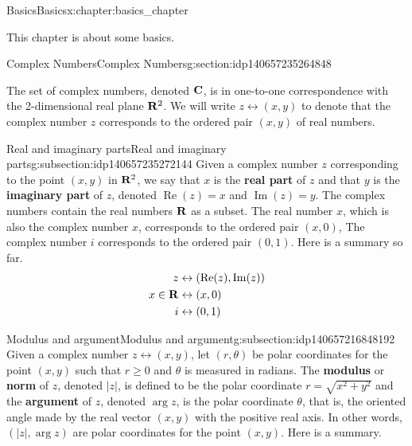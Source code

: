 \documentclass[oneside,10pt,]{book}
\newcommand{\terminology}[1]{\textbf{#1}}
\numberwithin{equation}{section}
\DeclareMathOperator{\re}{Re}
\DeclareMathOperator{\im}{Im}
\newcommand{\C}{{\rm \bf C}}
\newcommand{\R}{{\rm \bf R}}
\newcommand{\amp}{&}
\begin{document}
\begin{chapterptx}{Basics}{}{Basics}{}{}{x:chapter:basics_chapter}
\begin{introduction}{}%
This chapter is about some basics.\end{introduction}%
%
%
\typeout{************************************************}
\typeout{************************************************}
%
\begin{sectionptx}{Complex Numbers}{}{Complex Numbers}{}{}{g:section:idp140657235264848}
\begin{introduction}{}%
The set of complex numbers, denoted \(\C\), is in one-to-one correspondence with the 2-dimensional real plane \(\R^2\). We will write \(z\leftrightarrow (x,y)\) to denote that the complex number \(z\) corresponds to the ordered pair \((x,y)\) of real numbers.%
\end{introduction}%
%
%
\typeout{************************************************}
\typeout{************************************************}
%
\begin{subsectionptx}{Real and imaginary parts}{}{Real and imaginary parts}{}{}{g:subsection:idp140657235272144}
Given a complex number \(z\) corresponding to the point \((x,y)\) in \(\R^2\), we say that \(x\) is the \terminology{real part} of \(z\) and that \(y\) is the \terminology{imaginary part} of \(z\), denoted \(\re(z)=x\) and \(\im(z)=y\). The complex numbers contain the real numbers \(\R\) as a subset. The real number \(x\), which is also the complex number \(x\), corresponds to the ordered pair \((x,0)\), The complex number \(i\) corresponds to the ordered pair \((0,1)\). Here is a summary so far.%
%
\begin{align*}
z \amp \leftrightarrow (\re(z),\im(z))\\
x\in \R \amp \leftrightarrow (x,0)\\
i \amp \leftrightarrow (0,1)
\end{align*}
\end{subsectionptx}
%
%
\typeout{************************************************}
\typeout{************************************************}
%
\begin{subsectionptx}{Modulus and argument}{}{Modulus and argument}{}{}{g:subsection:idp140657216848192}
Given a complex number \(z\leftrightarrow (x,y)\), let \((r,\theta)\) be polar coordinates for the point \((x,y)\) such that \(r\geq 0\) and \(\theta\) is measured in radians. The \terminology{modulus} or \terminology{norm} of \(z\), denoted \(|z|\), is defined to be the polar coordinate \(r=\sqrt{x^2+y^2}\) and the \terminology{argument} of \(z\), denoted \(\arg{z}\), is the polar coordinate \(\theta\), that is, the oriented angle made by the real vector \((x,y)\) with the positive real axis. In other words, \((|z|,\arg{z})\) are polar coordinates for the point \((x,y)\). Here is a summary.%

\end{subsectionptx}
\end{sectionptx}
\end{chapterptx}
\end{document}
